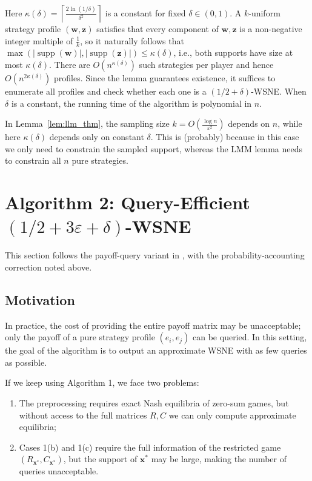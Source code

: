 Here $\kappa(\delta) = \left\lceil \frac{2 \ln (1/\delta)}{\delta^2} \right\rceil$ is a constant for fixed $\delta \in (0,1)$. A $k$-uniform strategy profile $(\mathbf{w}, \mathbf{z})$ satisfies that every component of $\mathbf{w}, \mathbf{z}$ is a non-negative integer multiple of $\frac{1}{k}$, so it naturally follows that $\max(|\operatorname{supp}(\mathbf{w})|, |\operatorname{supp}(\mathbf{z})|) \le \kappa(\delta)$, i.e., both supports have size at most $\kappa(\delta)$. There are $O(n^{\kappa(\delta)})$ such strategies per player and hence $O(n^{2\kappa(\delta)})$ profiles. Since the lemma guarantees existence, it suffices to enumerate all profiles and check whether each one is a $(1/2+\delta)$-WSNE. When $\delta$ is a constant, the running time of the algorithm is polynomial in $n$.

\begin{remark}
  In Lemma~\ref{lem:llm_thm}, the sampling size $k = O\left(\frac{\log n}{\varepsilon^2}\right)$ depends on $n$, while here $\kappa(\delta)$ depends only on constant $\delta$. This is (probably) because in this case we only need to constrain the sampled support, whereas the LMM lemma needs to constrain all $n$ pure strategies.
\end{remark}

\section{Algorithm 2: Query-Efficient \texorpdfstring{$(1/2+3\varepsilon+\delta)$}{1/2+3ε+δ}-WSNE}

This section follows the payoff-query variant in \cite[Section~4]{12WSNE}, with the probability-accounting correction noted above.

\subsection{Motivation}
In practice, the cost of providing the entire payoff matrix may be unacceptable; only the payoff of a pure strategy profile $(e_i, e_j)$ can be queried. In this setting, the goal of the algorithm is to output an approximate WSNE with as few queries as possible.

If we keep using Algorithm 1, we face two problems:
\begin{enumerate}
  \item The preprocessing requires exact Nash equilibria of zero-sum games, but without access to the full matrices $R, C$ we can only compute approximate equilibria;
  \item Cases 1(b) and 1(c) require the full information of the restricted game $(R_{\mathbf{x}^*}, C_{\mathbf{x}^*})$, but the support of $\mathbf{x}^*$ may be large, making the number of queries unacceptable.
\end{enumerate}

